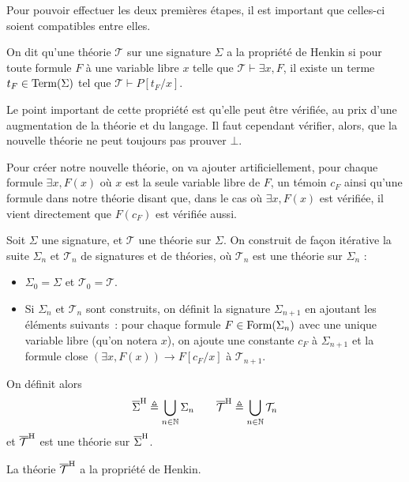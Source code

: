 Pour pouvoir effectuer les deux premières étapes, il est important que celles-ci
soient compatibles entre elles.

\begin{definition}
  On dit qu'une théorie $\mathcal T$ sur une signature $\Sigma$ a la propriété
  de Henkin si pour toute formule $F$ à une variable libre $x$ telle que
  $\mathcal T\vdash\exists x, F$, il existe un terme $t_F\in\operatorname{Term}(\Sigma)$ tel
  que $\mathcal T\vdash P[t_F/x]$.
\end{definition}

Le point important de cette propriété est qu'elle peut être vérifiée, au prix
d'une augmentation de la théorie et du langage. Il faut cependant vérifier,
alors, que la nouvelle théorie ne peut toujours pas prouver $\bot$.

Pour créer notre nouvelle théorie, on va ajouter artificiellement, pour chaque
formule $\exists x, F(x)$ où $x$ est la seule variable libre de $F$, un témoin
$c_F$ ainsi qu'une formule dans notre théorie disant que, dans le cas où
$\exists x, F(x)$ est vérifiée, il vient directement que $F(c_F)$ est vérifiée
aussi.

\begin{definition}
  Soit $\Sigma$ une signature, et $\mathcal T$ une théorie sur $\Sigma$. On
  construit de façon itérative la suite $\Sigma_n$ et $\mathcal T_n$ de
  signatures et de théories, où $\mathcal T_n$ est une théorie sur $\Sigma_n$ :
  \begin{itemize}
  \item $\Sigma_0 = \Sigma$ et $\mathcal T_0 = \mathcal T$.
  \item Si $\Sigma_n$ et $\mathcal T_n$ sont construits, on définit la signature
    $\Sigma_{n+1}$ en ajoutant les éléments suivants~: pour chaque formule
    $F \in \operatorname{Form}(\Sigma_n)$ avec une unique variable libre
    (qu'on notera $x$), on ajoute une constante $c_F$ à $\Sigma_{n+1}$ et la
    formule close $(\exists x, F(x))\to F[c_F/x]$ à $\mathcal T_{n+1}$.
  \end{itemize}
  On définit alors
  \[\overline{\Sigma}^{\mathrm H}\triangleq \bigcup_{n\in\mathbb N}\Sigma_n
  \qquad\overline{\mathcal T}^{\mathrm H} \triangleq \bigcup_{n \in \mathbb N}\mathcal T_n\]
  et $\overline{\mathcal T}^{\mathrm H}$ est une théorie sur $\overline{\Sigma}^{\mathrm H}$.
\end{definition}

\begin{property}
  La théorie $\overline{\mathcal T}^{\mathrm H}$ a la propriété de Henkin.
\end{property}

